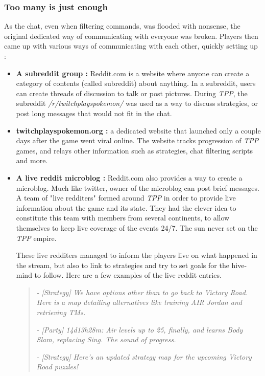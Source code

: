 \documentclass[a4paper]{article}
\begin{document}
\subsubsection{Too many is just enough}
As the chat, even when filtering commands, was flooded with nonsense, the original dedicated way of communicating with everyone was broken. Players then came up with various ways of communicating with each other, quickly setting up :
\begin{itemize}
\item \textbf{A subreddit group :} Reddit.com is a website where anyone can create a category of contents (called subreddit) about anything. In a subreddit, users can create threads of discussion to talk or post pictures. During \textit{TPP}, the subreddit \textit{/r/twitchplayspokemon/} was used as a way to discuss strategies, or post long messages that would not fit in the chat.
\item \textbf{twitchplayspokemon.org :} a dedicated website that launched only a couple days after the game went viral online. The website tracks progression of \textit{TPP} games, and relays other information such as strategies, chat filtering scripts and more.
\item \textbf{A live reddit microblog :} Reddit.com also provides a way to create a microblog. Much like twitter, owner of the microblog can post brief messages. A team of "live redditers" formed around \textit{TPP} in order to provide live information about the game and its state. They had the clever idea to constitute this team with members from several continents, to allow themselves to keep live coverage of the events 24/7. The sun never set on the \textit{TPP} empire.

These live redditers managed to inform the players live on what happened in the stream, but also to link to strategies and try to set goals for the hive-mind to follow. Here are a few examples of the live reddit entries.
\begin{quote}
\textit{- [Strategy] We have options other than to go back to Victory Road. Here is a map detailing alternatives like training AIR Jordan and retrieving TMs.}

\textit{- [Party] 14d13h28m: Air levels up to 25, finally, and learns Body Slam, replacing Sing. The sound of progress.}

\textit{- [Strategy] Here's an updated strategy map for the upcoming Victory Road puzzles! }


\end{quote}
\end{itemize}
\end{document}
